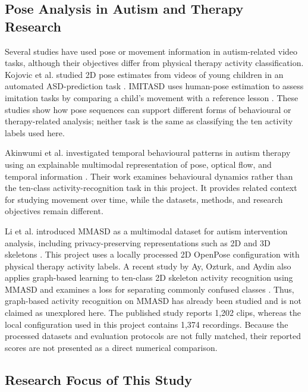 \subsection{Pose Analysis in Autism and Therapy Research}

Several studies have used pose or movement information in autism-related video tasks, although their objectives differ from physical therapy activity classification. Kojovic et al. studied 2D pose estimates from videos of young children in an automated ASD-prediction task \cite{Kojovic2021Pose}. IMITASD uses human-pose estimation to assess imitation tasks by comparing a child's movement with a reference lesson \cite{Said2024IMITASD}. These studies show how pose sequences can support different forms of behavioural or therapy-related analysis; neither task is the same as classifying the ten activity labels used here.

Akinwumi et al. investigated temporal behavioural patterns in autism therapy using an explainable multimodal representation of pose, optical flow, and temporal information \cite{Akinwumi2026Dynamics}. Their work examines behavioural dynamics rather than the ten-class activity-recognition task in this project. It provides related context for studying movement over time, while the datasets, methods, and research objectives remain different.

Li et al. introduced MMASD as a multimodal dataset for autism intervention analysis, including privacy-preserving representations such as 2D and 3D skeletons \cite{li2023mmasd}. This project uses a locally processed 2D OpenPose configuration with physical therapy activity labels. A recent study by Ay, Ozturk, and Aydin also applies graph-based learning to ten-class 2D skeleton activity recognition using MMASD and examines a loss for separating commonly confused classes \cite{Ay2026}. Thus, graph-based activity recognition on MMASD has already been studied and is not claimed as unexplored here. The published study reports 1,202 clips, whereas the local configuration used in this project contains 1,374 recordings. Because the processed datasets and evaluation protocols are not fully matched, their reported scores are not presented as a direct numerical comparison.

\subsection{Research Focus of This Study}

